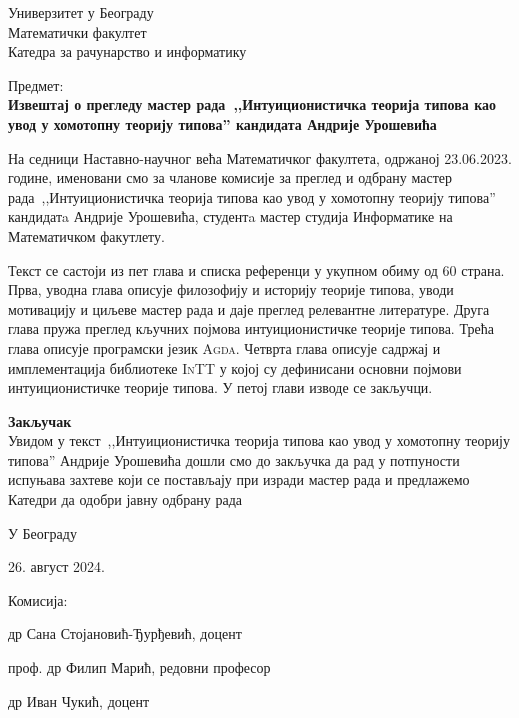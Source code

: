 \documentclass[a4paper]{letter}
\begin{document}
Универзитет у Београду\\
Математички факултет\\
Катедра за рачунарство и информатику

\vspace{2cm}

Предмет:\\
\textbf{Извештај о прегледу мастер рада~,,Интуиционистичка теорија типова као увод у хомотопну теорију типова'' кандидата Андрије Урошевића}

\vspace{0.6cm}

На седници Наставно-научног већа Математичког факултета, одржаној 23.06.2023. године,
именовани смо за чланове комисије за преглед и одбрану мастер рада~,,Интуиционистичка теорија типова као увод у хомотопну теорију типова'' кандидатa Андрије Урошевића, студентa
мастер студија Информатике на Математичком факутлету.

Текст се састоји из пет глава и списка референци у укупном обиму од 60 страна. Прва, уводна
глава описује филозофију и историју теорије типова, уводи мотивацију и циљеве мастер рада и даје преглед релевантне литературе. Друга глава пружа преглед
кључних појмова интуиционистичке теорије типова. Трећа
глава описује програмски језик \textsc{Agda}. Четврта глава описује садржај и имплементација библиотеке \textsc{InTT} у којој су дефинисани основни појмови интуиционистичке теорије типова. У петој глави изводе се закључци.

\vspace{0.4cm}

\textbf{Закључак}\\
Увидом у текст~,,Интуиционистичка теорија типова као увод у хомотопну теорију типова''
Андрије Урошевића дошли смо до закључка да рад у потпуности испуњава захтеве који се
постављају при изради мастер рада и предлажемо Катедри да одобри јавну одбрану рада

\vspace{1.2cm}

У Београду

26. август 2024.

\vspace{0.5cm}

Комисија:

др Сана Стојановић-Ђурђевић, доцент

проф. др Филип Марић, редовни професор

др Иван Чукић, доцент
\end{document}
